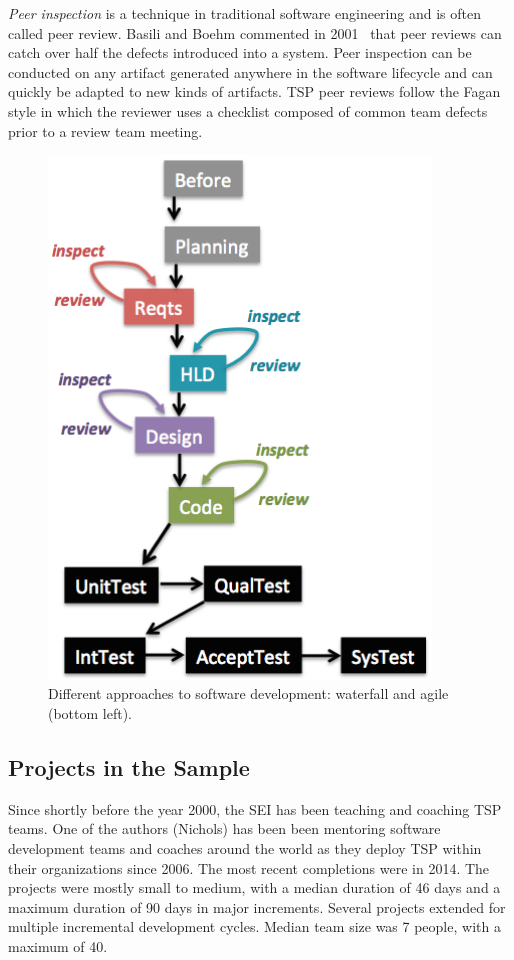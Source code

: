   
 
{\em Peer inspection} is a  technique in
traditional software engineering and is often called peer review.
 Basili and Boehm   commented in 2001~\cite{boehm01} 
that peer reviews can catch over half the defects introduced into a system.
Peer inspection can be conducted on any artifact generated anywhere in the software
lifecycle and can quickly be adapted to new kinds of artifacts. TSP peer reviews follow the Fagan style in which the reviewer uses a checklist composed of common team defects prior to a review team meeting. 


\begin{figure}[!t]  
\includegraphics[width=4in]{img/waterfall-v3.png}  
\caption{Different approaches to software development:  waterfall and agile (bottom left).}
\label{fig:waterfall}
\end{figure}


\subsection{Projects in the Sample}
Since shortly before the year 2000, the SEI has been teaching and coaching TSP teams. One of the authors (Nichols) has been been mentoring software development teams and coaches around the world as they deploy TSP within their organizations since 2006.  The  most recent completions were in 2014.
The projects were mostly small to medium, with a median duration of 46 days and a maximum duration of 90 days in major increments. 
Several projects extended for multiple incremental development cycles. 
Median team size was 7 people, with a maximum of 40. 

